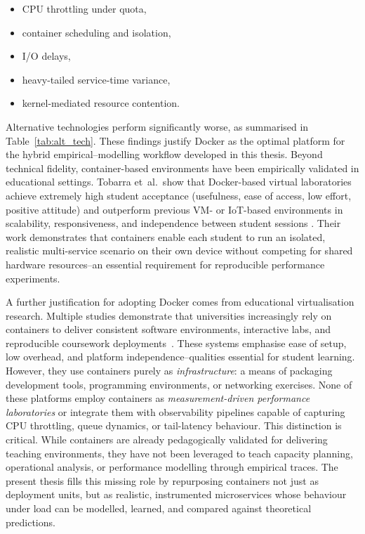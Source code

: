 \begin{itemize}
    \item CPU throttling under quota,
    \item container scheduling and isolation,
    \item I/O delays,
    \item heavy-tailed service-time variance,
    \item kernel-mediated resource contention.
\end{itemize}

Alternative technologies perform significantly worse, as summarised in
Table~\ref{tab:alt_tech}. These findings justify Docker as the optimal platform for the hybrid
empirical--modelling workflow developed in this thesis. Beyond technical fidelity, container-based environments have been
empirically validated in educational settings. Tobarra et~al.\ show that
Docker-based virtual laboratories achieve extremely high student
acceptance (usefulness, ease of access, low effort, positive attitude)
and outperform previous VM- or IoT-based environments in scalability,
responsiveness, and independence between student sessions
\cite{Tobarra2020}. Their work demonstrates that containers enable each
student to run an isolated, realistic multi-service scenario on their
own device without competing for shared hardware resources--an essential
requirement for reproducible performance experiments.

A further justification for adopting Docker comes from educational virtualisation research. Multiple studies demonstrate that universities increasingly rely on containers to deliver consistent software environments, interactive labs, and reproducible coursework deployments~\cite{CvLabs,KaunasEdu,PortableCompInstr}. These systems emphasise ease of setup, low overhead, and platform independence--qualities essential for student learning. However, they use containers purely as \emph{infrastructure}: a means of packaging development tools, programming environments, or networking exercises. None of these platforms employ containers as \emph{measurement-driven performance laboratories} or integrate them with observability pipelines capable of capturing CPU throttling, queue dynamics, or tail-latency behaviour. This distinction is critical. While containers are already pedagogically validated for delivering teaching environments, they have not been leveraged to teach capacity planning, operational analysis, or performance modelling through empirical traces. The present thesis fills this missing role by repurposing containers not just as deployment units, but as realistic, instrumented microservices whose behaviour under load can be modelled, learned, and compared against theoretical predictions.

